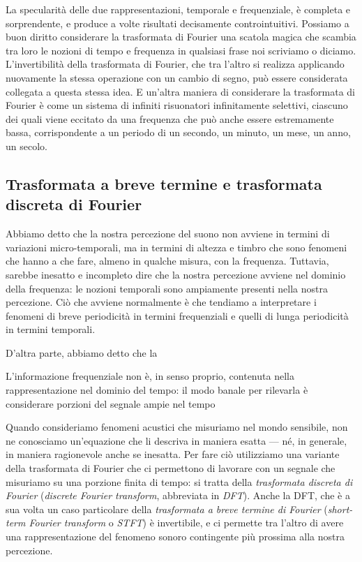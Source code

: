 \documentclass[11pt]{report}
\begin{document}
La specularità delle due rappresentazioni, temporale e frequenziale, è completa e sorprendente, e produce a volte risultati decisamente controintuitivi. Possiamo a buon diritto considerare la trasformata di Fourier una scatola magica che scambia tra loro le nozioni di tempo e frequenza in qualsiasi frase noi scriviamo o diciamo. L'invertibilità della trasformata di Fourier, che tra l'altro si realizza applicando nuovamente la stessa operazione con un cambio di segno, può essere considerata collegata a questa stessa idea. E un'altra maniera di considerare la trasformata di Fourier è come un sistema di infiniti risuonatori infinitamente selettivi, ciascuno dei quali viene eccitato da una frequenza che può anche essere estremamente bassa, corrispondente a un periodo di un secondo, un minuto, un mese, un anno, un secolo.


\subsection{Trasformata a breve termine e trasformata discreta di Fourier}

Abbiamo detto che la nostra percezione del suono non avviene in termini di variazioni micro-temporali, ma in termini di altezza e timbro che sono fenomeni che hanno a che fare, almeno in qualche misura, con la frequenza. Tuttavia, sarebbe inesatto e incompleto dire che la nostra percezione avviene nel dominio della frequenza: le nozioni temporali sono ampiamente presenti nella nostra percezione. Ciò che avviene normalmente è che tendiamo a interpretare i fenomeni di breve periodicità in termini frequenziali e quelli di lunga periodicità in termini temporali. 



D'altra parte, abbiamo detto che la 


L'informazione frequenziale non è, in senso proprio, contenuta nella rappresentazione nel dominio del tempo: il modo banale per rilevarla è considerare porzioni del segnale ampie nel tempo 






Quando consideriamo fenomeni acustici che misuriamo nel mondo sensibile, non ne conosciamo un'equazione che li descriva in maniera esatta --- né, in generale, in maniera ragionevole anche se inesatta. Per fare ciò utilizziamo una variante della trasformata di Fourier che ci permettono di lavorare con un segnale che misuriamo su una porzione finita di tempo: si tratta della \emph{trasformata discreta di Fourier} (\emph{discrete Fourier transform}, abbreviata in \emph{DFT}). Anche la DFT, che è a sua volta un caso particolare della \emph{trasformata a breve termine di Fourier} (\emph{short-term Fourier transform} o \emph{STFT}) è invertibile, e ci permette tra l'altro di avere una rappresentazione del fenomeno sonoro contingente più prossima alla nostra percezione.
\end{document}
